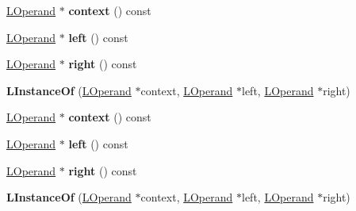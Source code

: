\begin{DoxyCompactItemize}
\item 
\hyperlink{classv8_1_1internal_1_1_l_operand}{L\+Operand} $\ast$ {\bfseries context} () const \hypertarget{classv8_1_1internal_1_1_l_instance_of_a1b27b2320dde2f64e3530dc627908888}{}\label{classv8_1_1internal_1_1_l_instance_of_a1b27b2320dde2f64e3530dc627908888}

\item 
\hyperlink{classv8_1_1internal_1_1_l_operand}{L\+Operand} $\ast$ {\bfseries left} () const \hypertarget{classv8_1_1internal_1_1_l_instance_of_a25d3b20c6819feb68c88a83a9f9d5399}{}\label{classv8_1_1internal_1_1_l_instance_of_a25d3b20c6819feb68c88a83a9f9d5399}

\item 
\hyperlink{classv8_1_1internal_1_1_l_operand}{L\+Operand} $\ast$ {\bfseries right} () const \hypertarget{classv8_1_1internal_1_1_l_instance_of_aa76d8ac6252398fda6be50e6458cbe9d}{}\label{classv8_1_1internal_1_1_l_instance_of_aa76d8ac6252398fda6be50e6458cbe9d}

\item 
{\bfseries L\+Instance\+Of} (\hyperlink{classv8_1_1internal_1_1_l_operand}{L\+Operand} $\ast$context, \hyperlink{classv8_1_1internal_1_1_l_operand}{L\+Operand} $\ast$left, \hyperlink{classv8_1_1internal_1_1_l_operand}{L\+Operand} $\ast$right)\hypertarget{classv8_1_1internal_1_1_l_instance_of_a8ad0d7b134a9a55d1a38cb1fdfa5c885}{}\label{classv8_1_1internal_1_1_l_instance_of_a8ad0d7b134a9a55d1a38cb1fdfa5c885}

\item 
\hyperlink{classv8_1_1internal_1_1_l_operand}{L\+Operand} $\ast$ {\bfseries context} () const \hypertarget{classv8_1_1internal_1_1_l_instance_of_a1b27b2320dde2f64e3530dc627908888}{}\label{classv8_1_1internal_1_1_l_instance_of_a1b27b2320dde2f64e3530dc627908888}

\item 
\hyperlink{classv8_1_1internal_1_1_l_operand}{L\+Operand} $\ast$ {\bfseries left} () const \hypertarget{classv8_1_1internal_1_1_l_instance_of_a25d3b20c6819feb68c88a83a9f9d5399}{}\label{classv8_1_1internal_1_1_l_instance_of_a25d3b20c6819feb68c88a83a9f9d5399}

\item 
\hyperlink{classv8_1_1internal_1_1_l_operand}{L\+Operand} $\ast$ {\bfseries right} () const \hypertarget{classv8_1_1internal_1_1_l_instance_of_aa76d8ac6252398fda6be50e6458cbe9d}{}\label{classv8_1_1internal_1_1_l_instance_of_aa76d8ac6252398fda6be50e6458cbe9d}

\item 
{\bfseries L\+Instance\+Of} (\hyperlink{classv8_1_1internal_1_1_l_operand}{L\+Operand} $\ast$context, \hyperlink{classv8_1_1internal_1_1_l_operand}{L\+Operand} $\ast$left, \hyperlink{classv8_1_1internal_1_1_l_operand}{L\+Operand} $\ast$right)\hypertarget{classv8_1_1internal_1_1_l_instance_of_a8ad0d7b134a9a55d1a38cb1fdfa5c885}{}\label{classv8_1_1internal_1_1_l_instance_of_a8ad0d7b134a9a55d1a38cb1fdfa5c885}


\end{DoxyCompactItemize}
